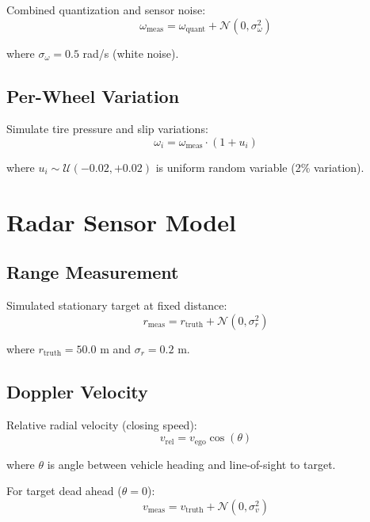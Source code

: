 \documentclass[11pt,a4paper]{article}
\begin{document}
Combined quantization and sensor noise:
\begin{equation}
\omega_{\text{meas}} = \omega_{\text{quant}} + \mathcal{N}(0, \sigma_{\omega}^2)
\end{equation}

where $\sigma_{\omega} = 0.5$ rad/s (white noise).

\subsection{Per-Wheel Variation}

Simulate tire pressure and slip variations:
\begin{equation}
\omega_i = \omega_{\text{meas}} \cdot (1 + u_i)
\end{equation}

where $u_i \sim \mathcal{U}(-0.02, +0.02)$ is uniform random variable (2\% variation).

\section{Radar Sensor Model}

\subsection{Range Measurement}

Simulated stationary target at fixed distance:
\begin{equation}
r_{\text{meas}} = r_{\text{truth}} + \mathcal{N}(0, \sigma_r^2)
\end{equation}

where $r_{\text{truth}} = 50.0$ m and $\sigma_r = 0.2$ m.

\subsection{Doppler Velocity}

Relative radial velocity (closing speed):
\begin{equation}
v_{\text{rel}} = v_{\text{ego}} \cos(\theta)
\end{equation}

where $\theta$ is angle between vehicle heading and line-of-sight to target.

For target dead ahead ($\theta = 0$):
\begin{equation}
v_{\text{meas}} = v_{\text{truth}} + \mathcal{N}(0, \sigma_v^2)
\end{equation}
\end{document}
